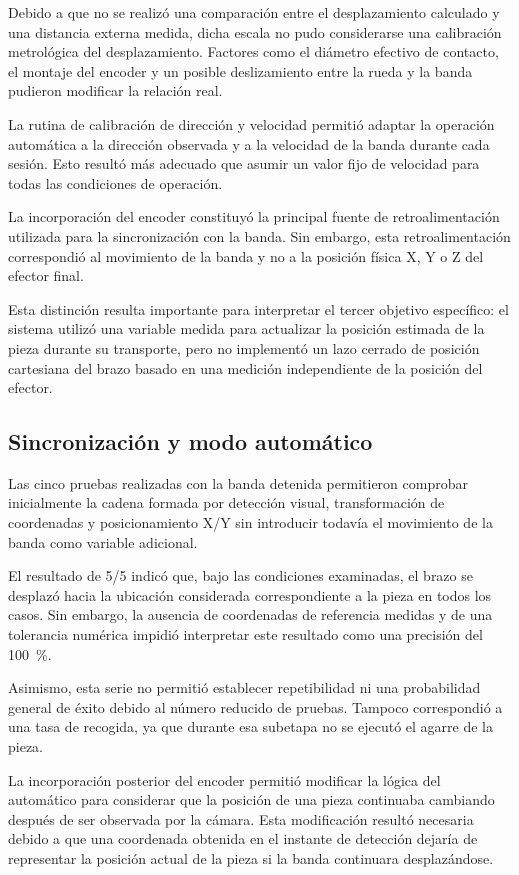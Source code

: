 Debido a que no se realizó una comparación entre el desplazamiento calculado y una distancia externa medida, dicha escala no pudo considerarse una calibración metrológica del desplazamiento. Factores como el diámetro efectivo de contacto, el montaje del encoder y un posible deslizamiento entre la rueda y la banda pudieron modificar la relación real.

La rutina de calibración de dirección y velocidad permitió adaptar la operación automática a la dirección observada y a la velocidad de la banda durante cada sesión. Esto resultó más adecuado que asumir un valor fijo de velocidad para todas las condiciones de operación.

La incorporación del encoder constituyó la principal fuente de retroalimentación utilizada para la sincronización con la banda. Sin embargo, esta retroalimentación correspondió al movimiento de la banda y no a la posición física X, Y o Z del efector final.

Esta distinción resulta importante para interpretar el tercer objetivo específico: el sistema utilizó una variable medida para actualizar la posición estimada de la pieza durante su transporte, pero no implementó un lazo cerrado de posición cartesiana del brazo basado en una medición independiente de la posición del efector.


\subsection{Sincronización y modo automático}

Las cinco pruebas realizadas con la banda detenida permitieron comprobar inicialmente la cadena formada por detección visual, transformación de coordenadas y posicionamiento X/Y sin introducir todavía el movimiento de la banda como variable adicional.

El resultado de 5/5 indicó que, bajo las condiciones examinadas, el brazo se desplazó hacia la ubicación considerada correspondiente a la pieza en todos los casos. Sin embargo, la ausencia de coordenadas de referencia medidas y de una tolerancia numérica impidió interpretar este resultado como una precisión del 100~\%.

Asimismo, esta serie no permitió establecer repetibilidad ni una probabilidad general de éxito debido al número reducido de pruebas. Tampoco correspondió a una tasa de recogida, ya que durante esa subetapa no se ejecutó el agarre de la pieza.

La incorporación posterior del encoder permitió modificar la lógica del automático para considerar que la posición de una pieza continuaba cambiando después de ser observada por la cámara. Esta modificación resultó necesaria debido a que una coordenada obtenida en el instante de detección dejaría de representar la posición actual de la pieza si la banda continuara desplazándose.

